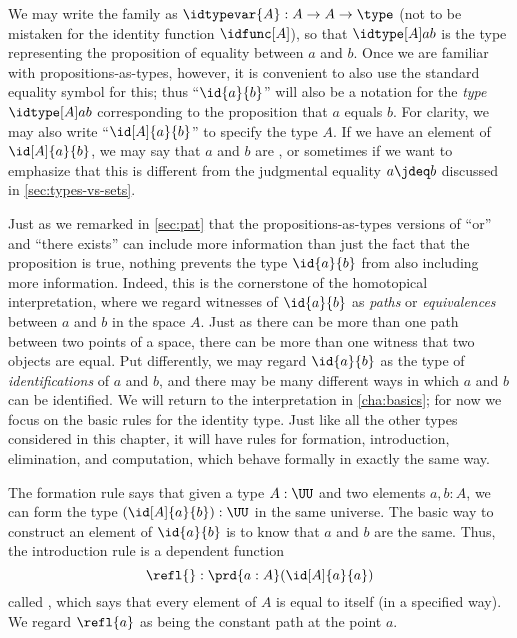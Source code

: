 We may write the family as $\idtypevar{A}:A\to A\to\type$ (not to be mistaken for the identity function $\idfunc[A]$), so that $\idtype[A]ab$ is the type representing the proposition of equality between $a$ and $b$.
Once we are familiar with propositions-as-types, however, it is convenient to also use the standard equality symbol for this; thus ``$\id{a}{b}$'' will also be a notation for the \emph{type} $\idtype[A]ab$ corresponding to the proposition that $a$ equals $b$.
For clarity, we may also write ``$\id[A]{a}{b}$'' to specify the type $A$.
If we have an element of $\id[A]{a}{b}$, we may say that $a$ and $b$ are , or sometimes  if we want to emphasize that this is different from the judgmental equality $a\jdeq b$ discussed in \cref{sec:types-vs-sets}.
%
%

Just as we remarked in \cref{sec:pat} that the propositions-as-types versions of ``or'' and ``there exists'' can include more information than just the fact that the proposition is true, nothing prevents  the type $\id{a}{b}$ from also including more information.
Indeed, this is the cornerstone of the homotopical interpretation, where we regard witnesses of $\id{a}{b}$ as \emph{paths} or \emph{equivalences} between $a$ and $b$ in the space $A$.  Just as there can be more than one path between two points of a space, there can be more than one witness that two objects are equal.  Put differently, we may regard $\id{a}{b}$ as the type of \emph{identifications} of $a$ and $b$, and there may be many different ways in which $a$ and $b$ can be identified.
We will return to the interpretation in \cref{cha:basics}; for now we focus on the basic rules for the identity type.
Just like all the other types considered in this chapter, it will have rules for formation, introduction, elimination, and computation, which behave formally in exactly the same way.

The formation rule says that given a type $A:\UU$ and two elements $a,b:A$, we can form the type $(\id[A]{a}{b}):\UU$ in the same universe.
The basic way to construct an element of $\id{a}{b}$ is to know that $a$ and $b$ are the same.
Thus, the introduction rule is a dependent function
\[\refl{} : \prd{a:A} (\id[A]{a}{a})\]
called ,
%
which says that every element of $A$ is equal to itself (in a specified way).  We regard $\refl{a}$ as being the
constant path
at the point $a$.

